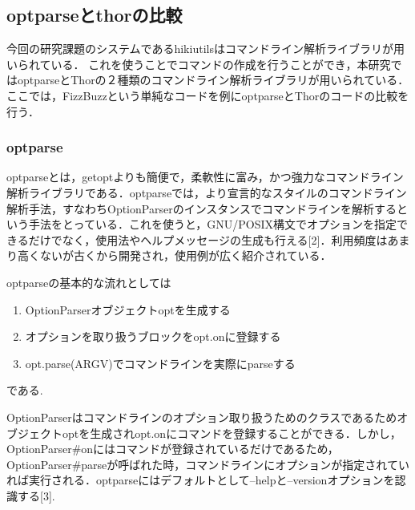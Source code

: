 
\subsection{optparseとthorの比較}
今回の研究課題のシステムであるhikiutilsはコマンドライン解析ライブラリが用いられている．
これを使うことでコマンドの作成を行うことができ，本研究ではoptparseとThorの２種類のコマンドライン解析ライブラリが用いられている．
ここでは，FizzBuzzという単純なコードを例にoptparseとThorのコードの比較を行う．

\subsubsection{optparse}
optparseとは，getoptよりも簡便で，柔軟性に富み，かつ強力なコマンドライン解析ライブラリである．optparseでは，より宣言的なスタイルのコマンドライン解析手法，すなわちOptionParserのインスタンスでコマンドラインを解析するという手法をとっている．これを使うと，GNU/POSIX構文でオプションを指定できるだけでなく，使用法やヘルプメッセージの生成も行える[2]．利用頻度はあまり高くないが古くから開発され，使用例が広く紹介されている．

optparseの基本的な流れとしては

\begin{enumerate}
\item OptionParserオブジェクトoptを生成する
\item オプションを取り扱うブロックをopt.onに登録する
\item opt.parse(ARGV)でコマンドラインを実際にparseする
\end{enumerate}
である.

OptionParserはコマンドラインのオプション取り扱うためのクラスであるためオブジェクトoptを生成されopt.onにコマンドを登録することができる．しかし，OptionParser\#onにはコマンドが登録されているだけであるため，OptionParser\#parseが呼ばれた時，コマンドラインにオプションが指定されていれば実行される．optparseにはデフォルトとして--helpと--versionオプションを認識する[3].

